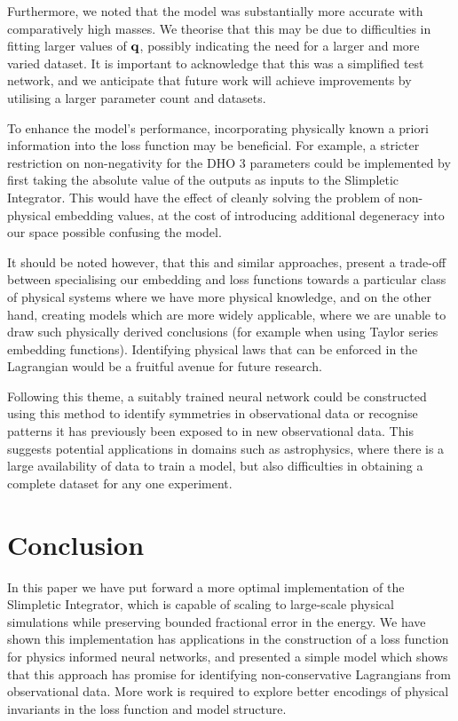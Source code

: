 Furthermore, we noted that the model was substantially more accurate with comparatively high masses. We theorise that this may be due to difficulties in fitting larger values of $\vb{q}$, possibly indicating the need for a larger and more varied dataset. It is important to acknowledge that this was a simplified test network, and we anticipate that future work will achieve improvements by utilising a larger parameter count and datasets.

To enhance the model's performance, incorporating physically known a priori information into the loss function may be beneficial. For example, a stricter restriction on non-negativity for the DHO 3 parameters could be implemented by first taking the absolute value of the outputs as inputs to the Slimpletic Integrator. This would have the effect of cleanly solving the problem of non-physical embedding values, at the cost of introducing additional degeneracy into our space possible confusing the model.

It should be noted however, that this and similar approaches, present a trade-off between specialising our embedding and loss functions towards a particular class of physical systems where we have more physical knowledge, and on the other hand, creating models which are more widely applicable, where we are unable to draw such physically derived conclusions (for example when using Taylor series embedding functions).
Identifying physical laws that can be enforced in the Lagrangian would be a fruitful avenue for future research.

Following this theme, a suitably trained neural network could be constructed using this method to identify symmetries in observational data or recognise patterns it has previously been exposed to in new observational data. This suggests potential applications in domains such as astrophysics, where there is a large availability of data to train a model, but also difficulties in obtaining a complete dataset for any one experiment.

\section{Conclusion}

In this paper we have put forward a more optimal implementation of the Slimpletic Integrator, which is capable of scaling to large-scale physical simulations while preserving bounded fractional error in the energy. We have shown this implementation has applications in the construction of a loss function for physics informed neural networks, and presented a simple model which shows that this approach has promise for identifying non-conservative Lagrangians from observational data. More work is required to explore better encodings of physical invariants in the loss function and model structure.
